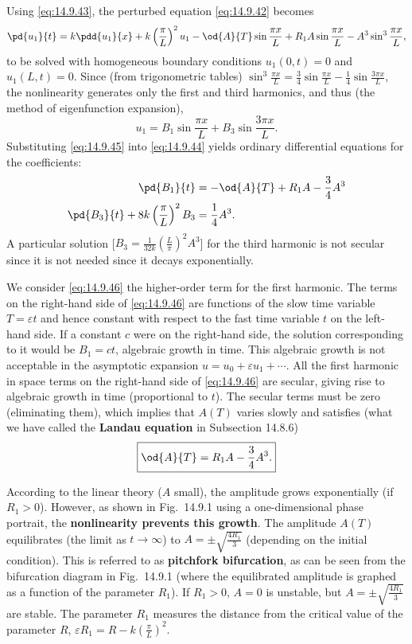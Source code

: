 Using \eqref{eq:14.9.43}, the perturbed equation \eqref{eq:14.9.42} becomes
\begin{equation}
\pd{u_1}{t} = k\pdd{u_1}{x} + k\left(\frac{\pi}{L}\right)^2 u_1 - \od{A}{T}\sin\frac{\pi x}{L} + R_1 A\sin\frac{\pi x}{L} - A^3\sin^3\frac{\pi x}{L},
\label{eq:14.9.44}
\end{equation}
to be solved with homogeneous boundary conditions $u_1(0,t) = 0$ and $u_1(L,t) = 0$. Since (from trigonometric tables) $\sin^3\frac{\pi x}{L} = \frac{3}{4}\sin\frac{\pi x}{L} - \frac{1}{4}\sin\frac{3\pi x}{L}$, the nonlinearity generates only the first and third harmonics, and thus (the method of eigenfunction expansion),
\begin{equation}
u_1 = B_1\sin\frac{\pi x}{L} + B_3\sin\frac{3\pi x}{L}.
\label{eq:14.9.45}
\end{equation}
Substituting \eqref{eq:14.9.45} into \eqref{eq:14.9.44} yields ordinary differential equations for the coefficients:
\begin{align}
\pd{B_1}{t} &= -\od{A}{T} + R_1 A - \frac{3}{4}A^3 \label{eq:14.9.46} \\
\pd{B_3}{t} + 8k\left(\frac{\pi}{L}\right)^2 B_3 &= \frac{1}{4}A^3. \label{eq:14.9.47}
\end{align}
A particular solution [$B_3 = \frac{1}{32k}(\frac{L}{\pi})^2 A^3$] for the third harmonic is not secular since it is not needed since it decays exponentially.

We consider \eqref{eq:14.9.46} the higher-order term for the first harmonic. The terms on the right-hand side of \eqref{eq:14.9.46} are functions of the slow time variable $T = \varepsilon t$ and hence constant with respect to the fast time variable $t$ on the left-hand side. If a constant $c$ were on the right-hand side, the solution corresponding to it would be $B_1 = ct$, algebraic growth in time. This algebraic growth is not acceptable in the asymptotic expansion $u = u_0 + \varepsilon u_1 + \cdots$. All the first harmonic in space terms on the right-hand side of \eqref{eq:14.9.46} are secular, giving rise to algebraic growth in time (proportional to $t$). The secular terms must be zero (eliminating them), which implies that $A(T)$ varies slowly and satisfies (what we have called the \textbf{Landau equation} in Subsection 14.8.6)
\begin{equation}
\boxed{\od{A}{T} = R_1 A - \frac{3}{4}A^3.}
\label{eq:14.9.48}
\end{equation}

According to the linear theory ($A$ small), the amplitude grows exponentially (if $R_1 > 0$). However, as shown in Fig.\ 14.9.1 using a one-dimensional phase portrait, the \textbf{nonlinearity prevents this growth}. The amplitude $A(T)$ equilibrates (the limit as $t \to \infty$) to $A = \pm\sqrt{\frac{4R_1}{3}}$ (depending on the initial condition). This is referred to as \textbf{pitchfork bifurcation}, as can be seen from the bifurcation diagram in Fig.\ 14.9.1 (where the equilibrated amplitude is graphed as a function of the parameter $R_1$). If $R_1 > 0$, $A = 0$ is unstable, but $A = \pm\sqrt{\frac{4R_1}{3}}$ are stable. The parameter $R_1$ measures the distance from the critical value of the parameter $R$, $\varepsilon R_1 = R - k(\frac{\pi}{L})^2$.

